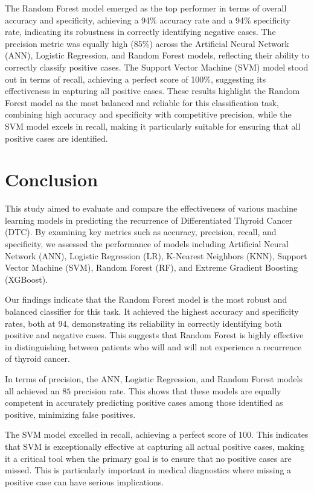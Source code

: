 \documentclass[
  letterpaper,
  DIV=11,
  numbers=noendperiod]{scrartcl}
\begin{document}
The Random Forest model emerged as the top performer in terms of overall
accuracy and specificity, achieving a 94\% accuracy rate and a 94\%
specificity rate, indicating its robustness in correctly identifying
negative cases. The precision metric was equally high (85\%) across the
Artificial Neural Network (ANN), Logistic Regression, and Random Forest
models, reflecting their ability to correctly classify positive cases.
The Support Vector Machine (SVM) model stood out in terms of recall,
achieving a perfect score of 100\%, suggesting its effectiveness in
capturing all positive cases. These results highlight the Random Forest
model as the most balanced and reliable for this classification task,
combining high accuracy and specificity with competitive precision,
while the SVM model excels in recall, making it particularly suitable
for ensuring that all positive cases are identified.

\section{Conclusion}\label{conclusion}

This study aimed to evaluate and compare the effectiveness of various
machine learning models in predicting the recurrence of Differentiated
Thyroid Cancer (DTC). By examining key metrics such as accuracy,
precision, recall, and specificity, we assessed the performance of
models including Artificial Neural Network (ANN), Logistic Regression
(LR), K-Nearest Neighbors (KNN), Support Vector Machine (SVM), Random
Forest (RF), and Extreme Gradient Boosting (XGBoost).

Our findings indicate that the Random Forest model is the most robust
and balanced classifier for this task. It achieved the highest accuracy
and specificity rates, both at \(94%
\), demonstrating its reliability in correctly identifying both positive
and negative cases. This suggests that Random Forest is highly effective
in distinguishing between patients who will and will not experience a
recurrence of thyroid cancer.

In terms of precision, the ANN, Logistic Regression, and Random Forest
models all achieved an \(85%
\) precision rate. This shows that these models are equally competent in
accurately predicting positive cases among those identified as positive,
minimizing false positives.

The SVM model excelled in recall, achieving a perfect score of \(100%
\). This indicates that SVM is exceptionally effective at capturing all
actual positive cases, making it a critical tool when the primary goal
is to ensure that no positive cases are missed. This is particularly
important in medical diagnostics where missing a positive case can have
serious implications.
\end{document}
